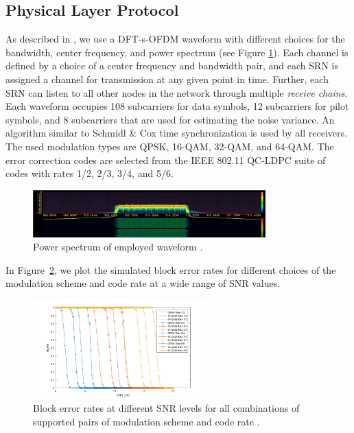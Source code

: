 \documentclass[11pt]{article}
\begin{document}
\subsection{Physical Layer Protocol}
As described in \cite{func-report}, we use a DFT-s-OFDM waveform with different choices for the bandwidth, center frequency, and power spectrum (see Figure \ref{fig:physical}). Each channel is defined by a choice of a center frequency and bandwidth pair, and each SRN is assigned a channel for transmission at any given point in time. Further, each SRN can listen to all other nodes in the network through multiple \emph{receive chains}. Each waveform occupies 108 subcarriers for data symbols, 12 subcarriers for pilot symbols, and 8 subcarriers that are used for estimating the noise variance. An algorithm similar to Schmidl \& Cox time synchronization is used by all receivers. The used modulation types are QPSK, 16-QAM, 32-QAM, and 64-QAM. The error correction codes are selected from the IEEE 802.11 QC-LDPC suite of codes with rates 1/2, 2/3, 3/4, and 5/6.  
\begin{figure} [htb]
     \centerline{
     \includegraphics[width = 0.8\textwidth]{Figures/PowSpec.png}}
     \caption{Power spectrum of employed waveform \cite[Figure $6$]{func-report}.}
     \label{fig:physical}
     \end{figure}
In Figure~\ref{fig:ber}, we plot the simulated block error rates for different choices of the modulation scheme and code rate at a wide range of SNR values. 
\begin{figure} [htb]
     \centerline{
     \includegraphics[width = 0.6\textwidth]{Figures/BLER.png}}
     \caption{Block error rates at different SNR levels for all combinations of supported pairs of modulation scheme and code rate \cite[Figure $7$]{func-report}.}
     \label{fig:ber}
     \end{figure}
\end{document}
